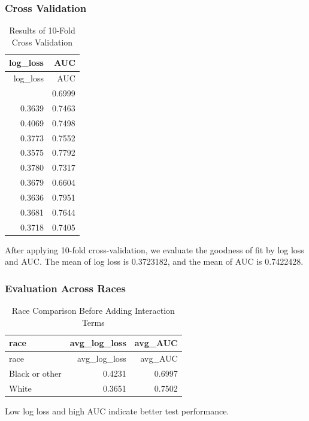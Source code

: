 \documentclass[
]{article}
\begin{document}
\newpage

\subsubsection{Cross Validation}\label{cross-validation}

\begin{longtable}[]{@{}rr@{}}
\caption{Results of 10-Fold Cross Validation}\tabularnewline
\toprule\noalign{}
log\_loss & AUC \\
\midrule\noalign{}
\endfirsthead
\toprule\noalign{}
log\_loss & AUC \\
\midrule\noalign{}
\endhead
\bottomrule\noalign{}
\endlastfoot
0.3681 & 0.6999 \\
0.3639 & 0.7463 \\
0.4069 & 0.7498 \\
0.3773 & 0.7552 \\
0.3575 & 0.7792 \\
0.3780 & 0.7317 \\
0.3679 & 0.6604 \\
0.3636 & 0.7951 \\
0.3681 & 0.7644 \\
0.3718 & 0.7405 \\
\end{longtable}

After applying 10-fold cross-validation, we evaluate the goodness of fit
by log loss and AUC. The mean of log loss is 0.3723182, and the mean of
AUC is 0.7422428.

\subsubsection{Evaluation Across Races}\label{evaluation-across-races}

\begin{longtable}[]{@{}lrr@{}}
\caption{Race Comparison Before Adding Interaction Terms}\tabularnewline
\toprule\noalign{}
race & avg\_log\_loss & avg\_AUC \\
\midrule\noalign{}
\endfirsthead
\toprule\noalign{}
race & avg\_log\_loss & avg\_AUC \\
\midrule\noalign{}
\endhead
\bottomrule\noalign{}
\endlastfoot
Black or other & 0.4231 & 0.6997 \\
White & 0.3651 & 0.7502 \\
\end{longtable}

Low log loss and high AUC indicate better test performance.
\end{document}
